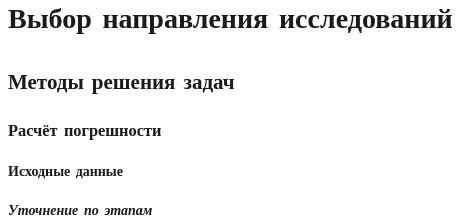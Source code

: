 \section{Выбор направления исследований}

\subsection{Методы решения задач}

\subsubsection{Расчёт погрешности}

\paragraph{Исходные данные}

\subparagraph{Уточнение по этапам} %

